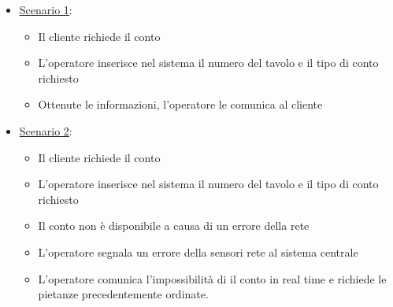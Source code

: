 \begin{enumerate}
\begin{itemize}
        \begin{itemize}
            \item \uline{Scenario 1}:
            \begin{itemize}
                \item Il cliente richiede il conto
                \item L'operatore inserisce nel sistema il numero del tavolo e il 
                    tipo di conto richiesto
                \item Ottenute le informazioni, l'operatore le comunica al cliente
            \end{itemize}
            \item \uline{Scenario 2}:
            \begin{itemize}
                \item Il cliente richiede il conto
                \item L'operatore inserisce nel sistema il numero del tavolo e il 
                    tipo di conto richiesto
                \item Il conto non \`e disponibile a causa di un errore della rete
                \item L'operatore segnala un errore della sensori rete al sistema centrale
                \item L'operatore comunica l'impossibilità di il conto in real time e richiede
                    le pietanze precedentemente ordinate.
            \end{itemize}
        \end{itemize}
    \end{itemize}
\end{enumerate}
            

